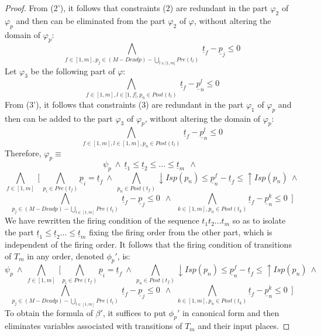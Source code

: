\documentclass[submission,copyright,creativecommons]{eptcs}
\newtheorem{proof}{Proof}
\numberwithin{equation}{section}
\begin{document}
\begin{proof}
From (2'), it follows that constraints (2) are redundant in the part $\varphi_2$ of $\varphi_p$ and then can be eliminated from the part $\varphi_2$ of $\varphi$, without altering the domain of $\varphi_p$:
$$\underset{f \in [1,m], p_j \in (M-Deadp) - \underset{l \in [1,m[} \bigcup Pre(t_{l})} \bigwedge   \  \underline{t}_{f} - \underline{p}_{j} \leq 0$$
Let $\varphi_3$ be the following part of $\varphi$: $$\underset{f \in [1,m], l \in [1,f[, p_n \in Post(t_{l})} \bigwedge   \  \underline{t}_{f} - \underline{p}_{n}^l \leq 0$$
From (3'), it follows that constraints (3) are redundant in the part $\varphi_1$ of $\varphi_p$ and then can be added to the part $\varphi_3$ of $\varphi_p$, without altering the domain of $\varphi_p$:
$$\underset{f \in [1,m], l \in [1,m], p_n \in Post(t_{l})} \bigwedge   \  \underline{t}_{f} - \underline{p}_{n}^l \leq 0$$
Therefore, $\varphi_p \equiv$ $$\psi_p \ \wedge \   \underline{t}_1 \leq \underline{t}_2 \leq ... \leq \underline{t}_m \ \ \wedge \ \ $$ $$ \underset{f \in [1,m]} \bigwedge \ [ \ \underset{p_i \in Pre(t_{f})} \bigwedge  \underline{p}_i = \underline{t}_f \ \wedge \ \underset{p_n \in Post(t_{f})} \bigwedge {\downarrow Isp(p_{n})} \leq \underline{p}_{n}^f - \underline{t}_{f} \leq
{\uparrow Isp(p_{n})} \ \wedge $$   $$ \underset{p_j \in (M-Deadp) - \underset{l \in [1,m]} \bigcup Pre(t_{l})} \bigwedge   \  \underline{t}_{f} - \underline{p}_{j} \leq 0  \ \ \wedge  \ \   \underset{ k \in[1,m], p_n \in Post(t_{k})} \bigwedge \underline{t}_{f} - \underline{p}_{n}^k \leq 0 \ \ ]$$
We have rewritten the firing condition of the sequence $t_1 t_2... t_m$ so as to isolate the part  $ \underline{t}_1 \leq \underline{t}_2 ... \leq \underline{t}_m $ fixing the firing order from the other part, which is independent of the firing order. It follows that the firing condition of transitions of $T_m$ in any order, denoted $\phi_p'$, is: $$\psi_p \ \wedge \  \underset{f \in [1,m]} \bigwedge \ [ \underset{p_i \in Pre(t_{f})} \bigwedge  \underline{p}_i = \underline{t}_f \ \wedge \ \underset{p_n \in Post(t_{f})} \bigwedge {\downarrow Isp(p_{n})} \leq \underline{p}_{n}^f - \underline{t}_{f} \leq
{\uparrow Isp(p_{n})} \ \wedge $$   $$ \underset{p_j \in (M-Deadp) - \underset{l \in [1,m]} \bigcup Pre(t_{l})} \bigwedge   \  \underline{t}_{f} - \underline{p}_{j} \leq 0  \ \ \wedge \  \  \underset{ k \in[1,m], p_n \in Post(t_{k})} \bigwedge \underline{t}_{f} - \underline{p}_{n}^k \leq 0  \ \ ]$$
To obtain the formula of $\beta'$, it suffices to put $\phi_p'$ in canonical form and then eliminates variables associated with transitions of $T_m$ and their input places. \normalsize
 \end{proof}
\end{document}
